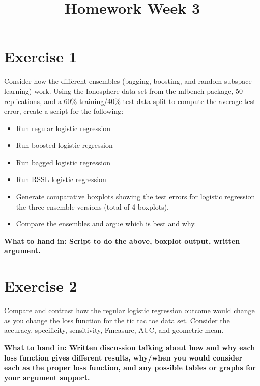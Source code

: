 \documentclass[a4paper]{article}
\begin{document}
\title{Homework Week 3}

\maketitle

\section{Exercise 1}

Consider how the different ensembles (bagging, boosting, and random subspace learning) work. Using the Ionosphere data set from the mlbench package, 50 replications, and a 60\%-training/40\%-test data split to compute the average test error, create a script for the following:

\begin{itemize}
\item Run regular logistic regression
\item Run boosted logistic regression
\item Run bagged logistic regression
\item Run RSSL logistic regression
\item Generate comparative boxplots showing the test errors for logistic regression  the three ensemble versions (total of 4 boxplots).
\item Compare the ensembles and argue which is best and why.
\end{itemize}

\textbf{What to hand in: Script to do the above, boxplot output, written argument.}

\section{Exercise 2}

Compare and contrast how the regular logistic regression outcome would change as you change the loss function for the tic tac toe data set. Consider the accuracy, specificity, sensitivity, Fmeasure, AUC, and geometric mean.

\textbf{What to hand in: Written discussion talking about how and why each loss function gives different results, why/when you would consider each as the proper loss function, and any possible tables or graphs for your argument support.}
\end{document}
